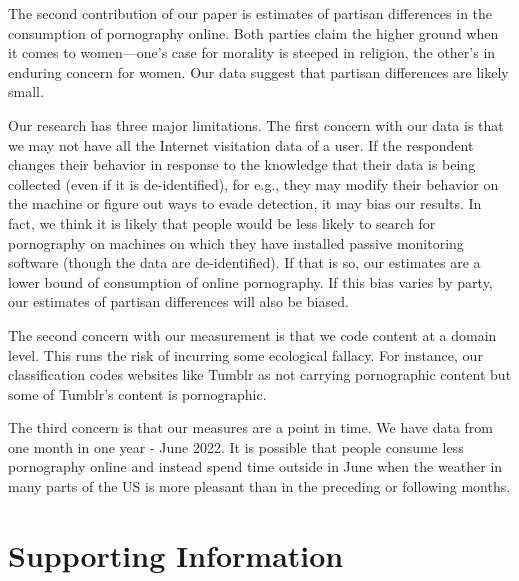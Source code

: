 \documentclass[12pt, letterpaper]{article}
\begin{document}
The second contribution of our paper is estimates of partisan differences in the consumption of pornography online. Both parties claim the higher ground when it comes to women---one's case for morality is steeped in religion, the other's in enduring concern for women. Our data suggest that partisan differences are likely small.

Our research has three major limitations. The first concern with our data is that we may not have all the Internet visitation data of a user. If the respondent changes their behavior in response to the knowledge that their data is being collected (even if it is de-identified), for e.g., they may modify their behavior on the machine or figure out ways to evade detection, it may bias our results. In fact, we think it is likely that people would be less likely to search for pornography on machines on which they have installed passive monitoring software (though the data are de-identified). If that is so, our estimates are a lower bound of consumption of online pornography. If this bias varies by party, our estimates of partisan differences will also be biased. 

The second concern with our measurement is that we code content at a domain level. This runs the risk of incurring some ecological fallacy. For instance, our classification codes websites like Tumblr as not carrying pornographic content but some of Tumblr's content is pornographic. 

The third concern is that our measures are a point in time. We have data from one month in one year - June 2022. It is possible that people consume less pornography online and instead spend time outside in June when the weather in many parts of the US is more pleasant than in the preceding or following months. 

\clearpage


\clearpage

\appendix
\renewcommand{\thesection}{SI \arabic{section}}
\renewcommand\thetable{\thesection.\arabic{table}}  
\renewcommand\thefigure{\thesection.\arabic{figure}}

\section{Supporting Information}\label{si}
\end{document}
